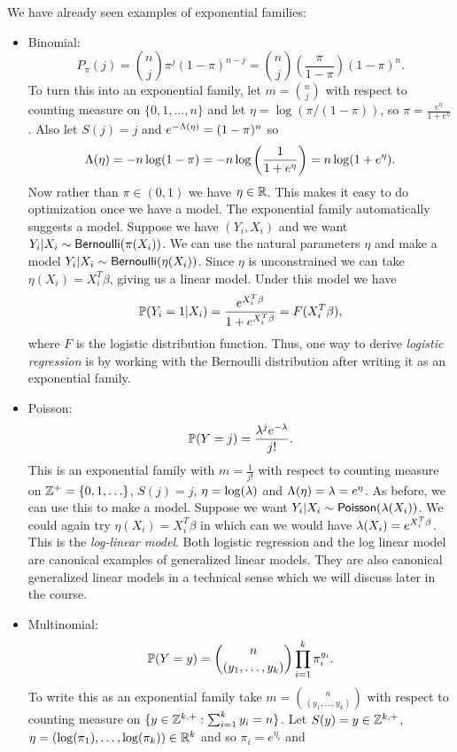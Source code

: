 \begin{examples}
    We have already seen examples of exponential families:
    \begin{itemize}
        \item Binomial:
        \[P_\pi(j) = \binom{n}{j}\pi^j (1-\pi)^{n-j} =\binom{n}{j}\left(\frac{\pi}{1-\pi}\right)(1-\pi)^{n}. \]
        To turn this into an exponential family, let $m = \binom{n}{j}$ with respect to counting measure on $\{0,1,\ldots,n\}$ and let $\eta = \log(\pi/(1-\pi))$, so $\pi = \frac{e^\eta}{1+e^{\eta}}$. Also let $S(j)=j$ and $e^{-\Lambda(\eta)} =(1-\pi)^n$ so 
        \[\Lambda(\eta) = -n\log(1-\pi)=-n\log\left(\frac{1}{1+e^{\eta}}\right)=n\log(1+e^{\eta}).\]
        Now rather than $\pi \in (0,1)$ we have $\eta \in {\mathbb R}$. This makes it easy to do optimization once we have a model. The exponential family automatically suggests a model. Suppose we have $(Y_i,X_i)$ and we want $Y_i |X_i \sim \mathsf{Bernoulli}(\pi(X_i))$. We can use the natural parameters $\eta$ and make a model $Y_i |X_i \sim \mathsf{Bernoulli}(\eta(X_i))$. Since $\eta$ is unconstrained we can take $\eta(X_i) = X_i^T\beta$, giving us a linear model. Under this model we have
        \[{\mathbb{P}}(Y_i=1|X_i) = \frac{e^{X_i^T\beta}}{1+e^{X_i^T\beta}} = F(X_i^T\beta), \]
        where $F$ is the logistic distribution function. Thus, one way to derive \emph{logistic regression} is by working with the Bernoulli distribution after writing it as an exponential family.
        \item Poisson:
        \[{\mathbb{P}}(Y = j) = \frac{\lambda^j e^{-\lambda}}{j!}.\] 
        This is an exponential family with $m= \frac{1}{j!}$ with respect to counting measure on ${{\mathbb Z}}^+=\{0,1,\ldots \}$, $S(j)=j$, $\eta = \log(\lambda)$ and $\Lambda(\eta)=\lambda = e^{\eta}$. As before, we can use this to make a model. Suppose we want $Y_i|X_i \sim \mathsf{Poisson}(\lambda(X_i))$. We could again try $\eta(X_i)=X_i^T\beta$ in which can we would have $\lambda(X_i) = e^{X_i^T\beta}$. This is the \emph{log-linear model}. Both logistic regression and the log linear model are canonical examples of generalized linear models. They are also canonical generalized linear models in a technical sense which we will discuss later in the course.
        \item Multinomial: 
        \[{\mathbb{P}}(Y=y) = \binom{n}{(y_1,\ldots,y_k)}\prod_{i=1}^k \pi_i^{y_i}.\] To write this as an exponential family take $m=\binom{n}{(y_1,\ldots,y_k)}$ with respect to counting measure on $\{y \in {{\mathbb Z}}^{k,+}: \sum_{i=1}^k y_i = n\}$. Let $S(y)=y \in {{\mathbb Z}}^{k,+}$, $\eta = (\log(\pi_1),\ldots,\log(\pi_k)) \in {\mathbb R}^k$ and so $\pi_i = e^{\eta_i}$ and 

\end{itemize}
\end{examples}
